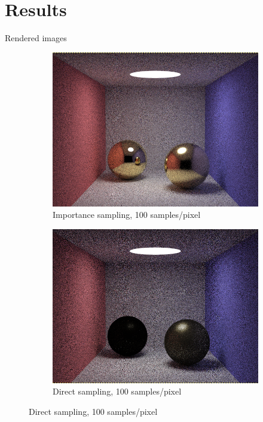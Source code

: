 \documentclass[10pt]{beamer}
\begin{document}
\section{Results}
\begin{frame}{Rendered images}
\begin{figure}[H]
\centering
\begin{subfigure}{.5\textwidth}
  \centering
  \includegraphics[width=.9\linewidth]{IS100.png}
  \caption{Importance sampling, 100 samples/pixel}
  \label{fig:sub1}
\end{subfigure}%
\begin{subfigure}{.5\textwidth}
  \centering
  \includegraphics[width=.9\linewidth]{DS100.png}
  \caption{Direct sampling, 100 samples/pixel}
  \label{fig:sub2}
\end{subfigure}
\end{figure}
\end{frame}
\end{document}
